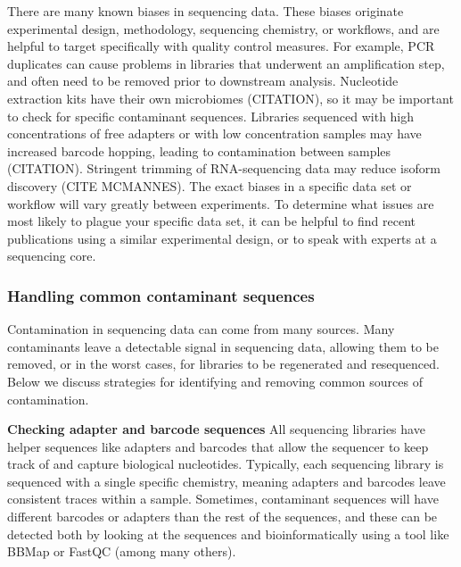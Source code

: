 \documentclass[10pt,letterpaper]{article}
\begin{document}
There are many known biases in sequencing data. These biases originate experimental design, methodology, sequencing chemistry, or workflows, and are helpful to target specifically with quality control measures. For example, PCR duplicates can cause problems in libraries that underwent an amplification step, and often need to be removed prior to downstream analysis. Nucleotide extraction kits have their own microbiomes (CITATION), so it may be important to check for specific contaminant sequences. Libraries sequenced with high concentrations of free adapters or with low concentration samples may have increased barcode hopping, leading to contamination between samples (CITATION). Stringent trimming of RNA-sequencing data may reduce isoform discovery (CITE MCMANNES). The exact biases in a specific data set or workflow will vary greatly between experiments. To determine what issues are most likely to plague your specific data set, it can be helpful to find recent publications using a similar experimental design, or to speak with experts at a sequencing core.


\subsubsection*{Handling common contaminant sequences}
Contamination in sequencing data can come from many sources. Many contaminants leave a detectable signal in sequencing data, allowing them to be removed, or in the worst cases, for libraries to be regenerated and resequenced. Below we discuss strategies for identifying and removing common sources of contamination.

\textbf{Checking adapter and barcode sequences}
All sequencing libraries have helper sequences like adapters and barcodes that allow the sequencer to keep track of and capture biological nucleotides. Typically, each sequencing library is sequenced with a single specific chemistry, meaning adapters and barcodes leave consistent traces within a sample. Sometimes, contaminant sequences will have different barcodes or adapters than the rest of the sequences, and these can be detected both by looking at the sequences and bioinformatically using a tool like BBMap or FastQC (among many others). 
\end{document}
